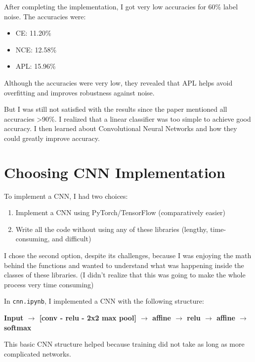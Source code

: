 \documentclass{article}
\begin{document}
After completing the implementation, I got very low accuracies for 60\% label noise. The accuracies were:

\begin{itemize}
    \item CE: 11.20\%
    \item NCE: 12.58\%
    \item APL: 15.96\%
\end{itemize}

Although the accuracies were very low, they revealed that APL helps avoid overfitting and improves robustness against noise.

But I was still not satisfied with the results since the paper mentioned all accuracies \textgreater 90\%. I realized that a linear classifier was too simple to achieve good accuracy. I then learned about Convolutional Neural Networks and how they could greatly improve accuracy.

\section*{Choosing CNN Implementation}
To implement a CNN, I had two choices:
\begin{enumerate}
    \item Implement a CNN using PyTorch/TensorFlow (comparatively easier)
    \item Write all the code without using any of these libraries (lengthy, time-consuming, and difficult)
\end{enumerate}

I chose the second option, despite its challenges, because I was enjoying the math behind the functions and wanted to understand what was happening inside the classes of these libraries. (I didn't realize that this was going to make the whole process very time consuming)

In \texttt{cnn.ipynb}, I implemented a CNN with the following structure:
\begin{center}
\textbf{Input \(\rightarrow\) [conv - relu - 2x2 max pool] \(\rightarrow\) affine \(\rightarrow\) relu \(\rightarrow\) affine \(\rightarrow\) softmax}
\end{center}

This basic CNN structure helped because training did not take as long as more complicated networks.
\end{document}
